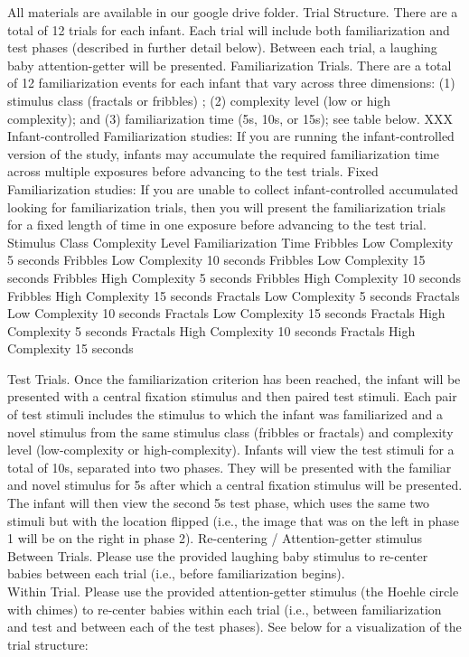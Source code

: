 \documentclass[
]{book}
\begin{document}
All materials are available in our google drive folder.
Trial Structure. There are a total of 12 trials for each infant. Each trial will include both familiarization and test phases (described in further detail below). Between each trial, a laughing baby attention-getter will be presented.
Familiarization Trials. There are a total of 12 familiarization events for each infant that vary across three dimensions: (1) stimulus class (fractals or fribbles) ; (2) complexity level (low or high complexity); and (3) familiarization time (5s, 10s, or 15s); see table below. XXX
Infant-controlled Familiarization studies: If you are running the infant-controlled version of the study, infants may accumulate the required familiarization time across multiple exposures before advancing to the test trials.
Fixed Familiarization studies: If you are unable to collect infant-controlled accumulated looking for familiarization trials, then you will present the familiarization trials for a fixed length of time in one exposure before advancing to the test trial.
Stimulus Class
Complexity Level
Familiarization Time
Fribbles
Low Complexity
5 seconds
Fribbles
Low Complexity
10 seconds
Fribbles
Low Complexity
15 seconds
Fribbles
High Complexity
5 seconds
Fribbles
High Complexity
10 seconds
Fribbles
High Complexity
15 seconds
Fractals
Low Complexity
5 seconds
Fractals
Low Complexity
10 seconds
Fractals
Low Complexity
15 seconds
Fractals
High Complexity
5 seconds
Fractals
High Complexity
10 seconds
Fractals
High Complexity
15 seconds

Test Trials. Once the familiarization criterion has been reached, the infant will be presented with a central fixation stimulus and then paired test stimuli. Each pair of test stimuli includes the stimulus to which the infant was familiarized and a novel stimulus from the same stimulus class (fribbles or fractals) and complexity level (low-complexity or high-complexity). Infants will view the test stimuli for a total of 10s, separated into two phases. They will be presented with the familiar and novel stimulus for 5s after which a central fixation stimulus will be presented. The infant will then view the second 5s test phase, which uses the same two stimuli but with the location flipped (i.e., the image that was on the left in phase 1 will be on the right in phase 2).
Re-centering / Attention-getter stimulus
Between Trials. Please use the provided laughing baby stimulus to re-center babies between each trial (i.e., before familiarization begins).\\
Within Trial. Please use the provided attention-getter stimulus (the Hoehle circle with chimes) to re-center babies within each trial (i.e., between familiarization and test and between each of the test phases).
See below for a visualization of the trial structure:
\end{document}
